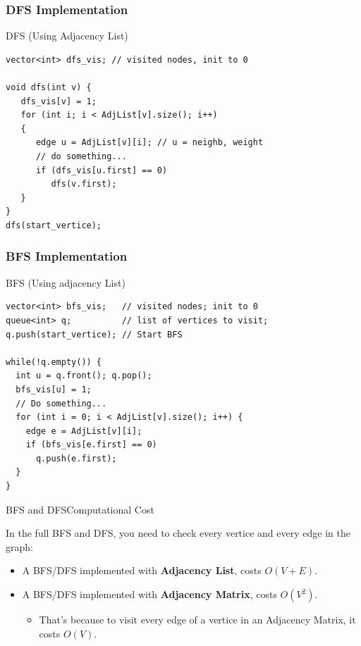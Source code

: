 \begin{frame}[fragile]
  \frametitle{DFS Implementation}
  \begin{exampleblock}{DFS (Using Adjacency List)}
\begin{verbatim}
vector<int> dfs_vis; // visited nodes, init to 0

void dfs(int v) {
   dfs_vis[v] = 1;
   for (int i; i < AdjList[v].size(); i++)
   {
      edge u = AdjList[v][i]; // u = neighb, weight
      // do something...
      if (dfs_vis[u.first] == 0)
         dfs(v.first);
   }
}
dfs(start_vertice);
\end{verbatim}
  \end{exampleblock}
\end{frame}

\begin{frame}[fragile]
  \frametitle{BFS Implementation}
  \begin{exampleblock}{BFS (Using adjacency List)}
\begin{verbatim}
vector<int> bfs_vis;   // visited nodes; init to 0
queue<int> q;          // list of vertices to visit;
q.push(start_vertice); // Start BFS

while(!q.empty()) {
  int u = q.front(); q.pop();
  bfs_vis[u] = 1;
  // Do something...
  for (int i = 0; i < AdjList[v].size(); i++) {
    edge e = AdjList[v][i];
    if (bfs_vis[e.first] == 0)
      q.push(e.first);
  }
}
\end{verbatim}
  \end{exampleblock}
\end{frame}

\begin{frame}{BFS and DFS}{Computational Cost}

  In the full BFS and DFS, you need to check every vertice and every edge in the graph:\bigskip

  \begin{itemize}
    \item A BFS/DFS implemented with {\bf Adjacency List}, costs $O(V+E)$.\bigskip

    \item A BFS/DFS implemented with {\bf Adjacency Matrix}, costs $O(V^2)$.
    \begin{itemize}
      \item That's because to visit every edge of a vertice in an Adjacency Matrix, it costs $O(V)$.
    \end{itemize}
  \end{itemize}
\end{frame}

